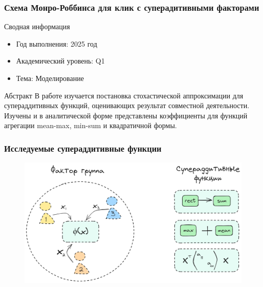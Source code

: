\begin{frame}
    \frametitle{Схема Монро-Роббинса для клик с суперадитивными факторами}
    \centering
    \begin{block}{Сводная информация}
        \begin{itemize}
            \item Год выполнения: 2025 год
            \item Академический уровень: Q1
            \item Тема: Моделирование
        \end{itemize}
    \end{block}  

    \begin{block}{Абстракт}
        В работе изучается постановка стохастической аппроксимации для супераддитивных функций, оценивающих
        результат совместной деятельности. 
        Изучены и в аналитической форме представлены коэффициенты для функций агрегации mean-max, min-sum и
        квадратичной формы.
    \end{block}
\end{frame}

\begin{frame}
    \frametitle{Исследуемые супераддитивные функции}
    \centering
    \begin{figure}
        \includegraphics[width=0.9\linewidth]{assets/group.excalidraw.png}
    \end{figure}
\end{frame}



